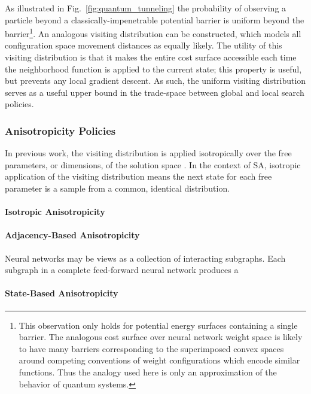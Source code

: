 \documentclass[11pt]{afthesis}
\begin{document}
	As illustrated in Fig.~\ref{fig:quantum_tunneling} the probability of observing a particle beyond a classically-impenetrable potential barrier is uniform beyond the barrier\footnote{This observation only holds for potential energy surfaces containing a single barrier. The analogous cost surface over neural network weight space is likely to have many barriers corresponding to the superimposed convex spaces around competing conventions of weight configurations which encode similar functions. Thus the analogy used here is only an approximation of the behavior of quantum systems.}. An analogous visiting distribution can be constructed, which models all configuration space movement distances as equally likely. The utility of this visiting distribution is that it makes the entire cost surface accessible each time the neighborhood function is applied to the current state; this property is useful, but prevents any local gradient descent. As such, the uniform visiting distribution serves as a useful upper bound in the trade-space between global and local search policies. 
	

	
	\subsubsection{Anisotropicity Policies}
	
	In previous work, the visiting distribution is applied isotropically over the free parameters, or dimensions, of the solution space \cite{tsallis1996generalizedsimulatedannealing,dallinga2004performancegsa}. In the context of SA, isotropic application of the visiting distribution means the next state for each free parameter is a sample from a common, identical distribution. 
	
	
	\paragraph{Isotropic Anisotropicity}
	
	
	\paragraph{Adjacency-Based Anisotropicity}
	
	Neural networks may be views as a collection of interacting subgraphs. Each subgraph in a complete feed-forward neural network produces a 
	
	
	\paragraph{State-Based Anisotropicity}
	
\end{document}
